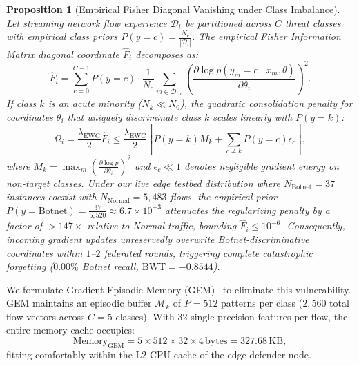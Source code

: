 \documentclass[journal,10pt,twocolumn]{IEEEtran}
\newtheorem{proposition}{Proposition}
\begin{document}
\begin{proposition}[Empirical Fisher Diagonal Vanishing under Class Imbalance]
\label{prop:fisher_vanishing}
Let streaming network flow experience $\mathcal{D}_t$ be partitioned across $C$ threat classes with empirical class priors $P(y=c) = \frac{N_c}{|\mathcal{D}_t|}$. The empirical Fisher Information Matrix diagonal coordinate $\hat{F}_i$ decomposes as:
\begin{equation}
\hat{F}_i = \sum_{c=0}^{C-1} P(y=c) \cdot \frac{1}{N_c} \sum_{m \in \mathcal{D}_{t, c}} \left(\frac{\partial \log p(y_m = c \mid x_m, \theta)}{\partial \theta_i}\right)^2.
\label{eq:fisher_decomposition}
\end{equation}
If class $k$ is an acute minority ($N_k \ll N_0$), the quadratic consolidation penalty for coordinates $\theta_i$ that uniquely discriminate class $k$ scales linearly with $P(y=k)$:
\begin{equation}
\Omega_i = \frac{\lambda_{\text{EWC}}}{2} \hat{F}_i \le \frac{\lambda_{\text{EWC}}}{2} \left[ P(y=k) M_k + \sum_{c \neq k} P(y=c) \epsilon_{c} \right],
\label{eq:fisher_bound}
\end{equation}
where $M_k = \max_{m} (\frac{\partial \log p}{\partial \theta_i})^2$ and $\epsilon_c \ll 1$ denotes negligible gradient energy on non-target classes. Under our live edge testbed distribution where $N_{\text{Botnet}} = 37$ instances coexist with $N_{\text{Normal}} = 5{,}483$ flows, the empirical prior $P(y=\text{Botnet}) = \frac{37}{5{,}520} \approx 6.7 \times 10^{-3}$ attenuates the regularizing penalty by a factor of $>147\times$ relative to Normal traffic, bounding $\hat{F}_i \le 10^{-6}$. Consequently, incoming gradient updates unreservedly overwrite Botnet-discriminative coordinates within $1$--$2$ federated rounds, triggering complete catastrophic forgetting ($0.00\%$ Botnet recall, $\text{BWT} = -0.8544$).
\end{proposition}

We formulate Gradient Episodic Memory (GEM)~\cite{lopez2017gradient} to eliminate this vulnerability. GEM maintains an episodic buffer $\mathcal{M}_k$ of $P=512$ patterns per class ($2{,}560$ total flow vectors across $C=5$ classes). With 32 single-precision features per flow, the entire memory cache occupies:
\begin{equation}
\text{Memory}_{\text{GEM}} = 5 \times 512 \times 32 \times 4\,\text{bytes} = 327.68\,\text{KB},
\label{eq:gem_memory}
\end{equation}
fitting comfortably within the L2 CPU cache of the edge defender node.
\end{document}
